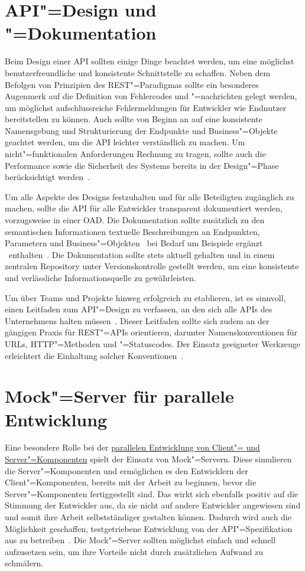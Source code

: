 \section{API"=Design und "=Dokumentation}
Beim Design einer \ac{API} sollten einige Dinge beachtet werden, um eine möglichst benutzerfreundliche und konsistente Schnittstelle zu schaffen.
Neben dem Befolgen von Prinzipien des \ac{REST}"=Paradigmas sollte ein besonderes Augenmerk auf die Definition von Fehlercodes und "=nachrichten gelegt werden, um möglichst aufschlussreiche Fehlermeldungen für Entwickler wie Endnutzer bereitstellen zu können.
Auch sollte von Beginn an auf eine konsistente Namensgebung und Strukturierung der Endpunkte und Business"=Objekte geachtet werden, um die \ac{API} leichter verständlich zu machen.
Um nicht"=funktionalen Anforderungen Rechnung zu tragen, sollte auch die Performance sowie die Sicherheit des Systems bereits in der Design"=Phase berücksichtigt werden~\cite[352\psq,354]{de23}.

Um alle Aspekte des Designs festzuhalten und für alle Beteiligten zugänglich zu machen, sollte die \ac{API} für alle Entwickler transparent dokumentiert werden, vorzugsweise in einer \ac{OAD}.
Die Dokumentation sollte zusätzlich zu den semantischen Informationen textuelle Beschreibungen an Endpunkten, Parametern und Business"=Objekten \textendash\ bei Bedarf um Beispiele ergänzt \textendash\ enthalten~\cite[353]{de23}.
Die Dokumentation sollte stets aktuell gehalten und in einem zentralen Repository unter Versionskontrolle gestellt werden, um eine konsistente und verlässliche Informationsquelle zu gewährleisten.

Um \AF über Teams und Projekte hinweg erfolgreich zu etablieren, ist es sinnvoll, einen Leitfaden zum \ac{API}"=Design zu verfassen, an den sich alle \acp{API} des Unternehmens halten müssen~\cites[3\psq]{kul23}[359]{de23}.
Dieser Leitfaden sollte sich zudem an der gängigen Praxis für \ac{REST}"=\acp{API} orientieren, darunter Namenskonventionen für \acp{URL}, \ac{HTTP}"=Methoden und "=Statuscodes.
Der Einsatz geeigneter Werkzeuge erleichtert die Einhaltung solcher Konventionen~\cite[360]{de23}.

\section{Mock"=Server für parallele Entwicklung}
\label{sec:mock-server}
Eine besondere Rolle bei der \hyperref[sec:parallel-dev]{parallelen Entwicklung von Client"= und Server"=Komponenten} spielt der Einsatz von Mock"=Servern.
Diese simulieren die Server"=Komponenten und ermöglichen es den Entwicklern der Client"=Komponenten, bereits mit der Arbeit zu beginnen, bevor die Server"=Komponenten fertiggestellt sind.
Das wirkt sich ebenfalls positiv auf die Stimmung der Entwickler aus, da sie nicht auf andere Entwickler angewiesen sind und somit ihre Arbeit selbstständiger gestalten können.
Dadurch wird auch die Möglichkeit geschaffen, testgetriebene Entwicklung von der \ac{API}"=Spezifikation aus zu betreiben~\cite[351,353]{de23}.
Die Mock"=Server sollten möglichst einfach und schnell aufzusetzen sein, um ihre Vorteile nicht durch zusätzlichen Aufwand zu schmälern.